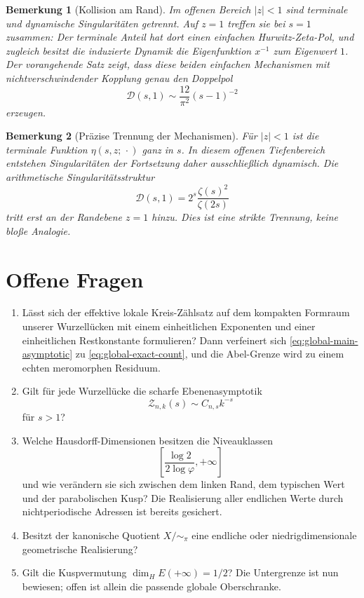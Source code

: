 \documentclass[11pt,a4paper]{article}
\newcommand{\Haus}{\operatorname{dim}_{H}}
\newtheorem{remark}{Bemerkung}[section]
\begin{document}
\begin{remark}[Kollision am Rand]
Im offenen Bereich $|z|<1$ sind terminale und dynamische
Singularitäten getrennt. Auf $z=1$ treffen sie bei $s=1$ zusammen:
Der terminale Anteil hat dort einen einfachen Hurwitz-Zeta-Pol, und
zugleich besitzt die induzierte Dynamik die Eigenfunktion $x^{-1}$ zum
Eigenwert $1$. Der vorangehende Satz zeigt, dass diese beiden einfachen
Mechanismen mit nichtverschwindender Kopplung genau den Doppelpol
\[
 \mathscr D(s,1)\sim\frac{12}{\pi^2}(s-1)^{-2}
\]
erzeugen.
\end{remark}

\begin{remark}[Präzise Trennung der Mechanismen]
Für $|z|<1$ ist die terminale Funktion $\eta(s,z;\,\cdot)$ ganz in
$s$. In diesem offenen Tiefenbereich entstehen Singularitäten der
Fortsetzung daher ausschließlich dynamisch. Die arithmetische
Singularitätsstruktur
\[
 \mathscr D(s,1)=2^s\frac{\zeta(s)^2}{\zeta(2s)}
\]
tritt erst an der Randebene $z=1$ hinzu. Dies ist eine strikte
Trennung, keine bloße Analogie.
\end{remark}

\section{Offene Fragen}

\begin{enumerate}[leftmargin=*,label=\arabic*.]
\item Lässt sich der effektive lokale Kreis-Zählsatz auf dem kompakten
Formraum unserer Wurzellücken mit einem einheitlichen Exponenten und einer
einheitlichen Restkonstante formulieren? Dann verfeinert sich
\eqref{eq:global-main-asymptotic} zu \eqref{eq:global-exact-count}, und
die Abel-Grenze wird zu einem echten meromorphen Residuum.
 \item Gilt für jede Wurzellücke die scharfe Ebenenasymptotik
 \[
  \mathcal Z_{n,k}(s)\sim C_{n,s}k^{-s}
 \]
 für $s>1$?
\item Welche Hausdorff-Dimensionen besitzen die Niveauklassen
\[
 \left[\frac{\log2}{2\log\varphi},+\infty\right]
\]
und wie verändern sie sich zwischen dem linken Rand, dem typischen Wert
und der parabolischen Kusp? Die Realisierung aller endlichen Werte durch
nichtperiodische Adressen ist bereits gesichert.
 \item Besitzt der kanonische Quotient $X/{\sim_\pi}$ eine endliche oder
 niedrigdimensionale geometrische Realisierung?
 \item Gilt die Kuspvermutung $\Haus E(+\infty)=1/2$? Die Untergrenze ist
 nun bewiesen; offen ist allein die passende globale Oberschranke.
\end{enumerate}
\end{document}
